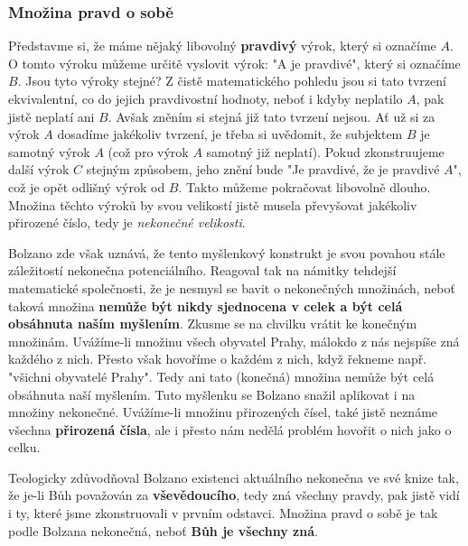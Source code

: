 \subsubsection{Množina pravd o sobě}
Představme si, že máme nějaký libovolný \textbf{pravdivý} výrok, který si označíme $A$. O tomto výroku můžeme určitě vyslovit výrok: "A je pravdivé", který si označíme $B$. Jsou tyto výroky stejné? Z čistě matematického pohledu jsou si tato tvrzení ekvivalentní, co do jejich pravdivostní hodnoty, neboť i kdyby neplatilo $A$, pak jistě neplatí ani $B$. Avšak zněním si stejná již tato tvrzení nejsou. Ať už si za výrok $A$ dosadíme jakékoliv tvrzení, je třeba si uvědomit, že subjektem $B$ je samotný výrok $A$ (což pro výrok $A$ samotný již neplatí). Pokud zkonstruujeme další výrok $C$ stejným způsobem, jeho znění bude "Je pravdivé, že je pravdivé $A$", což je opět odlišný výrok od $B$. Takto můžeme pokračovat libovolně dlouho. Množina těchto výroků by svou velikostí jistě musela převyšovat jakékoliv přirozené číslo, tedy je \emph{nekonečné velikosti}.

Bolzano zde však uznává, že tento myšlenkový konstrukt je svou povahou stále záležitostí nekonečna potenciálního. Reagoval tak na námitky tehdejší matematické společnosti, že je nesmysl se bavit o nekonečných množinách, neboť taková množina \textbf{nemůže být nikdy sjednocena v celek a být celá obsáhnuta naším myšlením}. Zkusme se na chvilku vrátit ke konečným množinám. Uvážíme-li množinu všech obyvatel Prahy, málokdo z nás nejspíše zná každého z nich. Přesto však hovoříme o každém z nich, když řekneme např. "všichni obyvatelé Prahy". Tedy ani tato (konečná) množina nemůže být celá obsáhnuta naší myšlením. Tuto myšlenku se Bolzano snažil aplikovat i na množiny nekonečné. Uvážíme-li množinu přirozených čísel, také jistě neznáme všechna \textbf{přirozená čísla}, ale i přesto nám nedělá problém hovořit o nich jako o celku.

Teologicky zdůvodňoval Bolzano existenci aktuálního nekonečna ve své knize tak, že je-li Bůh považován za \textbf{vševědoucího}, tedy zná všechny pravdy, pak jistě vidí i ty, které jsme zkonstruovali v prvním odstavci. Množina pravd o sobě je tak podle Bolzana nekonečná, neboť \textbf{Bůh je všechny zná}.\cite{Bolzano1963}

